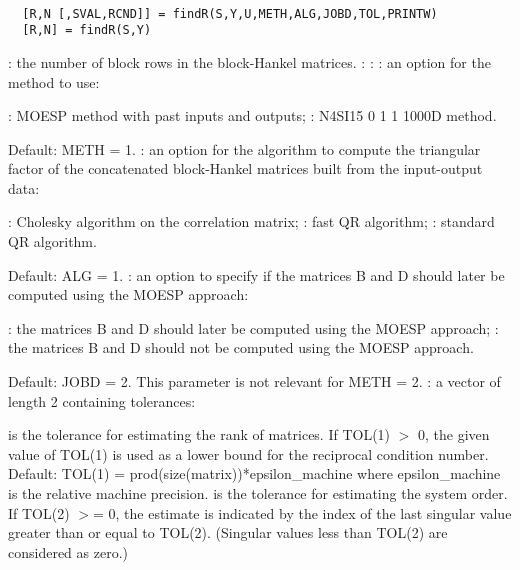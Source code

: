 \begin{mandesc}
   \\ %
\end{mandesc}
\begin{calling_sequence}
\begin{verbatim}
  [R,N [,SVAL,RCND]] = findR(S,Y,U,METH,ALG,JOBD,TOL,PRINTW)  
  [R,N] = findR(S,Y)  
\end{verbatim}
\end{calling_sequence}
\begin{parameters}
  \begin{varlist}
    : the number of block rows in the block-Hankel matrices.
    :
    :
    : an option for the method to use:
    \begin{varlist}
      :  MOESP method with past inputs and outputs;
      :  N4SI15     0     1     1  1000D method.
    \end{varlist}
    Default:    METH = 1.
    : an option for the algorithm to compute the triangular factor of the concatenated block-Hankel matrices built from the input-output data:
    \begin{varlist}
      :   Cholesky algorithm on the correlation matrix;
      :   fast QR algorithm;
      :   standard QR algorithm.
    \end{varlist}
    Default:    ALG = 1.
    : an option to specify if the matrices B and D should later be computed using the MOESP approach:
    \begin{varlist}
      :  the matrices B and D should later be computed using the MOESP approach;
      :  the matrices B and D should not be computed using the MOESP approach.
    \end{varlist}
    Default: JOBD = 2. This parameter is not relevant for METH = 2.
    : a vector of length 2 containing tolerances:
    \begin{varlist}
       is the tolerance for estimating the rank of matrices. If  TOL(1) $>$ 0,  the given value of  TOL(1)  is used as a lower bound for the reciprocal condition number.
      Default:    TOL(1) = prod(size(matrix))*epsilon\_machine where epsilon\_machine is the relative machine precision.
       is the tolerance for estimating the system order. If  TOL(2) $>$= 0,  the estimate is indicated by the index of the last singular value greater than or equal to  TOL(2).  (Singular values less than  TOL(2) are considered as zero.)

\end{varlist}
\end{varlist}
\end{parameters}
